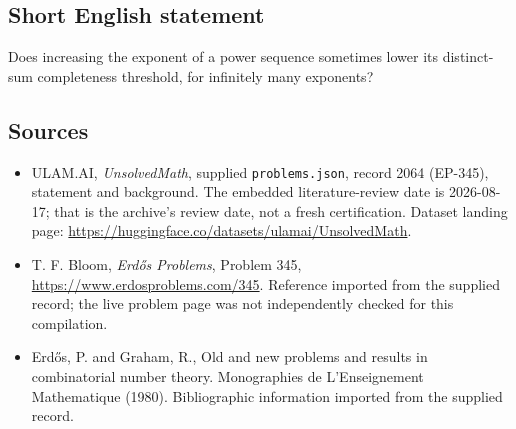 \documentclass[11pt,a4paper]{article}
\begin{document}
\subsection{Short English statement}

Does increasing the exponent of a power sequence sometimes lower its distinct-sum completeness threshold, for infinitely many exponents?

\subsection{Sources}

{\small

\begin{itemize}

\item[\hypertarget{source:2064:1}{S1}] ULAM.AI, \emph{UnsolvedMath}, supplied \texttt{problems.json}, record 2064 (EP-345), statement and background. The embedded literature-review date is 2026-08-17; that is the archive’s review date, not a fresh certification. Dataset landing page: \url{https://huggingface.co/datasets/ulamai/UnsolvedMath}.

\item[\hypertarget{source:2064:2}{S2}] T. F. Bloom, \emph{Erdős Problems}, Problem 345, \url{https://www.erdosproblems.com/345}. Reference imported from the supplied record; the live problem page was not independently checked for this compilation.

\item[\hypertarget{source:2064:3}{S3}] Erd\H{o}s, P. and Graham, R., Old and new problems and results in combinatorial number theory. Monographies de L'Enseignement Mathematique (1980). Bibliographic information imported from the supplied record.

\end{itemize}

}

\label{end:2064}
\end{document}
